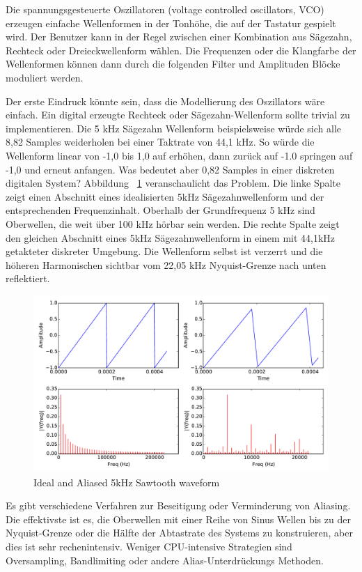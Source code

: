 Die spannungsgesteuerte Oszillatoren (voltage controlled oscillators, VCO) erzeugen einfache Wellenformen in der Tonhöhe, die auf der Tastatur gespielt wird. Der Benutzer kann in der Regel zwischen einer Kombination aus Sägezahn, Rechteck oder Dreieckwellenform wählen. Die Frequenzen oder die Klangfarbe der Wellenformen können dann durch die folgenden Filter und Amplituden Blöcke moduliert werden.

Der erste Eindruck könnte sein, dass die Modellierung des Oszillators wäre einfach. Ein digital erzeugte Rechteck oder Sägezahn-Wellenform sollte trivial zu implementieren. Die 5 kHz Sägezahn Wellenform beispielsweise würde sich alle 8,82 Samples weiderholen bei einer Taktrate von 44,1 kHz. So würde die Wellenform linear von -1,0 bis 1,0 auf erhöhen, dann zurück auf -1.0 springen auf -1,0 und erneut anfangen. Was bedeutet aber 0,82 Samples in einer diskreten digitalen System? Abbildung ~\ref{fig:aliasing_sawtooth} veranschaulicht das Problem. Die linke Spalte zeigt einen Abschnitt eines idealisierten 5kHz Sägezahnwellenform und der entsprechenden Frequenzinhalt. Oberhalb der Grundfrequenz 5 kHz sind Oberwellen, die weit über 100 kHz hörbar sein werden. Die rechte Spalte zeigt den gleichen Abschnitt eines 5kHz Sägezahnwellenform in einem mit 44,1kHz getakteter diskreter Umgebung. Die Wellenform selbst ist verzerrt und die höheren Harmonischen sichtbar  vom 22,05 kHz Nyquist-Grenze nach unten reflektiert.

\begin{figure}[H]
    \centering
    \includegraphics[width=\textwidth]{plots/graphics/sawtooth.pdf}
    \caption{Ideal and Aliased 5kHz Sawtooth waveform}
    \label{fig:aliasing_sawtooth}
\end{figure}

Es gibt verschiedene Verfahren zur Beseitigung oder Verminderung von Aliasing. Die effektivste ist es, die Oberwellen mit einer Reihe von Sinus Wellen bis zu der Nyquist-Grenze oder die Hälfte der Abtastrate des Systems zu konstruieren, aber dies ist sehr rechenintensiv. Weniger CPU-intensive Strategien sind Oversampling, Bandlimiting oder andere Alias-Unterdrückungs Methoden\cite{virtual_analog_synthesis}.




